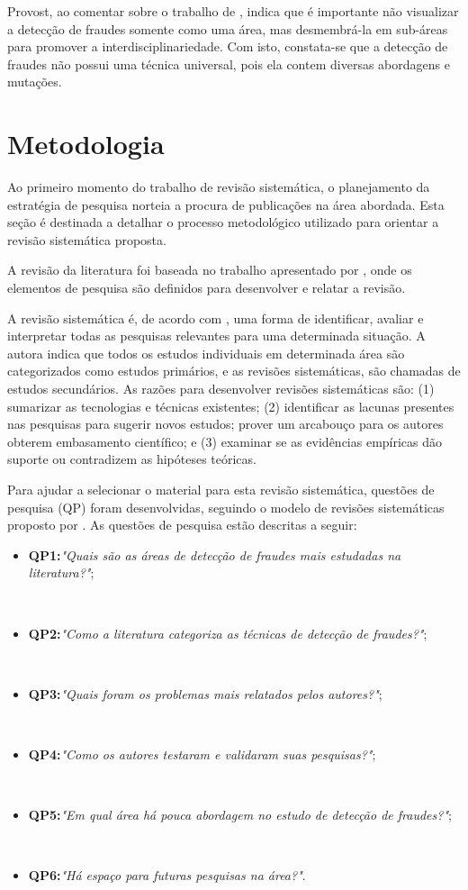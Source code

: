 \documentclass[smallextended]{svjour3}
\begin{document}
Provost, ao comentar sobre o trabalho de \cite{Bolton2002}, indica que é importante não visualizar a detecção de fraudes somente como uma área, mas desmembrá-la em sub-áreas para promover a interdisciplinariedade. Com isto, constata-se que a detecção de fraudes não possui uma técnica universal, pois ela contem diversas abordagens e mutações. 

\section{Metodologia}
\label{sec:3}

Ao primeiro momento do trabalho de revisão sistemática, o planejamento da estratégia de pesquisa norteia a procura de publicações na área abordada. Esta seção é destinada a detalhar o processo metodológico utilizado para orientar a revisão sistemática proposta.

A revisão da literatura foi baseada no trabalho apresentado por \cite{Kitchenham07guidelinesfor}, onde os elementos de pesquisa são definidos para desenvolver e relatar a revisão.

A revisão sistemática é, de acordo com \cite{Kitchenham2004}, uma forma de identificar, avaliar e interpretar todas as pesquisas relevantes para uma determinada situação. A autora indica que todos os estudos individuais em determinada área são categorizados como estudos primários, e as revisões sistemáticas, são chamadas de estudos secundários. As razões para desenvolver revisões sistemáticas são: (1) sumarizar as tecnologias e técnicas existentes; (2) identificar as lacunas presentes nas pesquisas para sugerir novos estudos; prover um arcabouço para os autores obterem embasamento científico; e (3) examinar se as evidências empíricas dão suporte ou contradizem as hipóteses teóricas. 

Para ajudar a selecionar o material para esta revisão sistemática, questões de pesquisa (QP) foram desenvolvidas, seguindo o modelo de revisões sistemáticas proposto por \cite{Kitchenham07guidelinesfor}. As questões de pesquisa estão descritas a seguir:

\begin{itemize}
	\item \textbf{QP1:}\textit{"Quais são as áreas de detecção de fraudes mais estudadas na literatura?"};
	 
	\
	\item \textbf{QP2:}\textit{"Como a literatura categoriza as técnicas de detecção de fraudes?"};
	
	\
	\item \textbf{QP3:}\textit{"Quais foram os problemas mais relatados pelos autores?"};
	
	\
	\item \textbf{QP4:}\textit{"Como os autores testaram e validaram suas pesquisas?"};
	
	\
	\item \textbf{QP5:}\textit{"Em qual área há pouca abordagem no estudo de detecção de fraudes?"};
	
	\
	\item \textbf{QP6:}\textit{"Há espaço para futuras pesquisas na área?"}.
		
\end{itemize}
\end{document}
